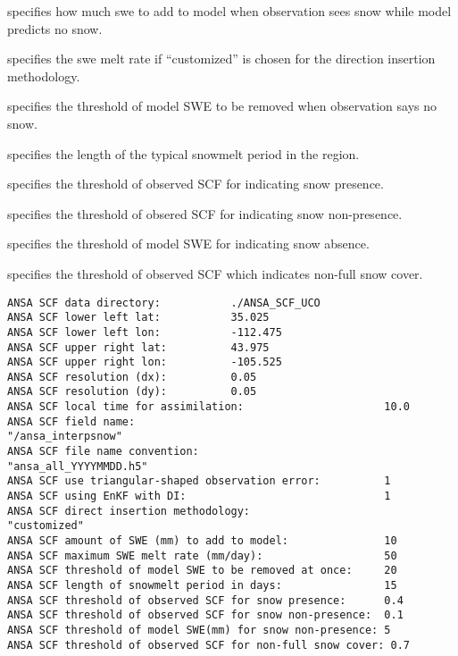   specifies how much
 swe to add to model when observation sees snow while model predicts
 no snow.

  specifies the swe melt rate
 if ``customized'' is chosen for the direction insertion methodology.

  specifies
 the threshold of model SWE to be removed when observation says no snow.

  specifies the length
 of the typical snowmelt period in the region.

  specifies
 the threshold of observed SCF for indicating snow presence.

 specifies the threshold of obsered SCF for indicating snow non-presence.

 specifies the threshold of model SWE for indicating snow absence.

 specifies the threshold of observed SCF which indicates non-full
 snow cover.
 

 \begin{Verbatim}[frame=single]
ANSA SCF data directory:           ./ANSA_SCF_UCO
ANSA SCF lower left lat:           35.025
ANSA SCF lower left lon:           -112.475
ANSA SCF upper right lat:          43.975
ANSA SCF upper right lon:          -105.525
ANSA SCF resolution (dx):          0.05
ANSA SCF resolution (dy):          0.05
ANSA SCF local time for assimilation:                      10.0
ANSA SCF field name:                                       "/ansa_interpsnow"
ANSA SCF file name convention:                             "ansa_all_YYYYMMDD.h5"
ANSA SCF use triangular-shaped observation error:          1
ANSA SCF using EnKF with DI:                               1
ANSA SCF direct insertion methodology:                     "customized"
ANSA SCF amount of SWE (mm) to add to model:               10
ANSA SCF maximum SWE melt rate (mm/day):                   50
ANSA SCF threshold of model SWE to be removed at once:     20
ANSA SCF length of snowmelt period in days:                15
ANSA SCF threshold of observed SCF for snow presence:      0.4
ANSA SCF threshold of observed SCF for snow non-presence:  0.1
ANSA SCF threshold of model SWE(mm) for snow non-presence: 5
ANSA SCF threshold of observed SCF for non-full snow cover: 0.7
 \end{Verbatim}






